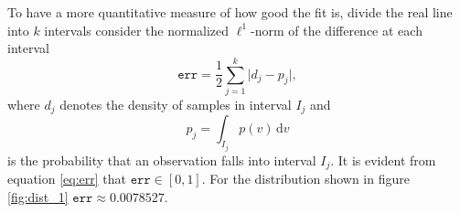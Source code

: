 To have a more quantitative measure of how good the fit is, divide the real line into $k$ intervals consider the normalized $\ell^1$-norm of the difference at each interval 
\begin{equation}\label{eq:err}
	\texttt{err} = \frac{1}{2} \sum_{j=1}^{k} \rvert d_j - p_j\lvert,
\end{equation}
where $d_j$ denotes the density of samples in interval $I_j$ and 
\[
	p_j = \int_{I_j} p(v) \, \text{d}v
\]
is the probability that an observation falls into interval $I_j$. It is evident from equation \ref{eq:err} that $\texttt{err}\in [0,1]$. For the distribution shown in figure \ref{fig:dist_1} $\texttt{err} \approx  0.0078527$.

%
%
%
%
%
